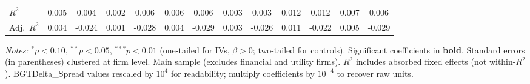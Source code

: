 \begin{landscape}
\begin{table}[H]
\begin{tabular}{lcccccccccccc}
$R^2$ & 0.005 & 0.004 & 0.002 & 0.006 & 0.006 & 0.006 & 0.003 & 0.003 & 0.012 & 0.012 & 0.007 & 0.006 \\
Adj.~$R^2$ & 0.004 & -0.024 & 0.001 & -0.028 & 0.004 & -0.029 & 0.003 & -0.026 & 0.011 & -0.022 & 0.005 & -0.029 \\
\bottomrule
\end{tabular}
\begin{minipage}{\linewidth}
\vspace{2pt}\scriptsize
\textit{Notes:} $^{*}p<0.10$, $^{**}p<0.05$, $^{***}p<0.01$ (one-tailed for IVs, $\beta > 0$; two-tailed for controls).
 Significant coefficients in \textbf{bold}.
 Standard errors (in parentheses) clustered at firm level.
 Main sample (excludes financial and utility firms).
 $R^2$ includes absorbed fixed effects (not within-$R^2$).
 BGTDelta\_Spread values rescaled by $10^4$ for readability; multiply coefficients by $10^{-4}$ to recover raw units.
\end{minipage}
\end{table}
\end{landscape}